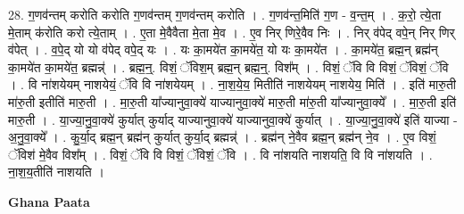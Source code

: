 \documentclass[17pt]{extarticle}
\begin{document}
28. ग॒णव॑न्तम् करोति करोति ग॒णव॑न्तम् ग॒णव॑न्तम् करोति । . ग॒णव॑न्त॒मिति॑ ग॒ण - व॒न्त॒म् । . क॒रो॒ त्ये॒ता मे॒ताम् क॑रोति करो त्ये॒ताम् । . ए॒ता मे॒वैवैता मे॒ता मे॒व । . ए॒व निर् णिरे॒वैव निः । . निर् व॑पेद् वपे॒न् निर् णिर् व॑पेत् । . व॒पे॒द् यो यो व॑पेद् वपे॒द् यः । . यः का॒मये॑त का॒मये॑त॒ यो यः का॒मये॑त । . का॒मये॑त॒ ब्रह्म॒न् ब्रह्म॑न् का॒मये॑त का॒मये॑त॒ ब्रह्मन्न्॑ । . ब्रह्म॒न्॒. विशं॒ ॅविश॒म् ब्रह्म॒न् ब्रह्म॒न्॒. विश᳚म् । . विशं॒ ॅवि वि विशं॒ ॅविशं॒ ॅवि । . वि ना॑शयेयम् नाशयेयं॒ ॅवि वि ना॑शयेयम् । . ना॒श॒ये॒य॒ मितीति॑ नाशयेयम् नाशयेय॒ मिति॑ । . इति॑ मारु॒ती मा॑रु॒ती इतीति॑ मारु॒ती । . मा॒रु॒ती या᳚ज्यानुवा॒क्ये॑ याज्यानुवा॒क्ये॑ मारु॒ती मा॑रु॒ती या᳚ज्यानुवा॒क्ये᳚ । . मा॒रु॒ती इति॑ मारु॒ती । . या॒ज्या॒नु॒वा॒क्ये॑ कुर्यात् कुर्याद् याज्यानुवा॒क्ये॑ याज्यानुवा॒क्ये॑ कुर्यात् । . या॒ज्या॒नु॒वा॒क्ये॑ इति॑ याज्या - अ॒नु॒वा॒क्ये᳚ । . कु॒र्या॒द् ब्रह्म॒न् ब्रह्म॑न् कुर्यात् कुर्या॒द् ब्रह्मन्न्॑ । . ब्रह्म॑न् ने॒वैव ब्रह्म॒न् ब्रह्म॑न् ने॒व । . ए॒व विशं॒ ॅविश॑ मे॒वैव विश᳚म् । . विशं॒ ॅवि वि विशं॒ ॅविशं॒ ॅवि । . वि ना॑शयति नाशयति॒ वि वि ना॑शयति । . ना॒श॒य॒तीति॑ नाशयति । \newline

\textbf{Ghana Paata } \newline
\end{document}
